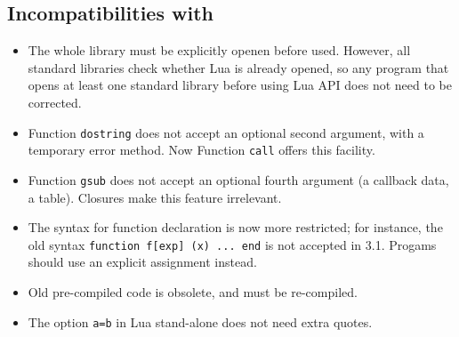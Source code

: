 \subsection*{Incompatibilities with }
\begin{itemize}

\item The whole library must be explicitly openen before used.
However, all standard libraries check whether Lua is already opened,
so any program that opens at least one standard library before using
Lua API does not need to be corrected.

\item Function \verb|dostring| does not accept an optional second argument,
with a temporary error method.
Now Function \verb|call| offers this facility.

\item Function \verb|gsub| does not accept an optional fourth argument
(a callback data, a table).
Closures make this feature irrelevant.

\item The syntax for function declaration is now more restricted;
for instance, the old syntax \verb|function f[exp] (x) ... end| is not
accepted in 3.1.
Progams should use an explicit assignment instead.

\item Old pre-compiled code is obsolete, and must be re-compiled.

\item The option \verb|a=b| in Lua stand-alone does not need extra quotes.

\end{itemize}

\newcommand{\indexentry}[2]{\item {#1} #2}
\begin{theindex}

\end{theindex}





